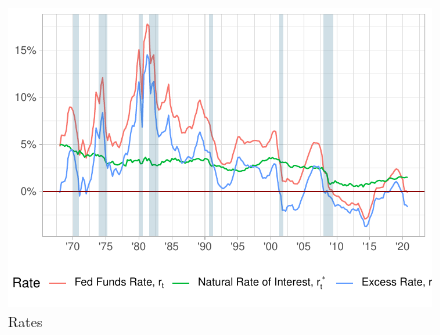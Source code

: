 \documentclass[11pt,pdf,aspectratio=129]{beamer}
\begin{document}
    \begin{frame}
        \begin{figure}[h!]\centering 
            \caption{Rates}\vspace{-4ex}
            \includegraphics[width=.7\textwidth]{rate_plot.pdf}
        \end{figure}
    \end{frame}
\end{document}
